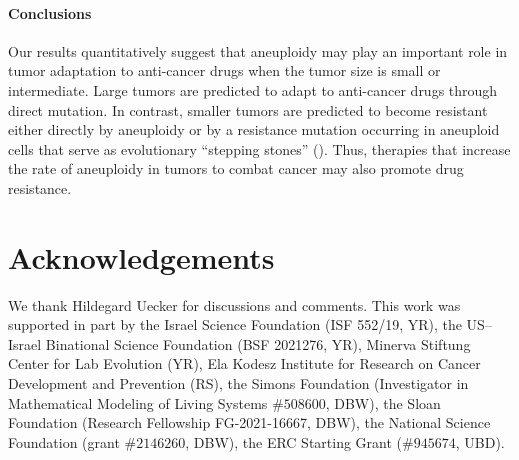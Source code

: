\documentclass[12pt]{extarticle}
\begin{document}
\paragraph{Conclusions}

Our results quantitatively suggest that aneuploidy may play an important role in tumor adaptation to anti-cancer drugs when the tumor size is small or intermediate. Large tumors are predicted to adapt to anti-cancer drugs through direct mutation. In contrast, smaller tumors are predicted to become resistant either directly by aneuploidy or by a resistance mutation occurring in aneuploid cells that serve as evolutionary ``stepping stones'' (). Thus, therapies that increase the rate of aneuploidy in tumors to combat cancer may also promote drug resistance.

{\small
\section*{Acknowledgements}
We thank Hildegard Uecker for discussions and comments. 
This work was supported in part by
the Israel Science Foundation (ISF 552/19, YR),
the US–Israel Binational Science Foundation (BSF 2021276, YR), 
Minerva Stiftung Center for Lab Evolution (YR), 
Ela Kodesz Institute for Research on Cancer Development and Prevention (RS),
the Simons Foundation (Investigator in Mathematical Modeling of Living Systems $\#508600$, DBW),
the Sloan Foundation (Research Fellowship FG-2021-16667, DBW),
the National Science Foundation (grant $\#2146260$, DBW), the ERC Starting Grant ($\#945674$, UBD).
}


\nolinenumbers
%



\clearpage
\end{document}
